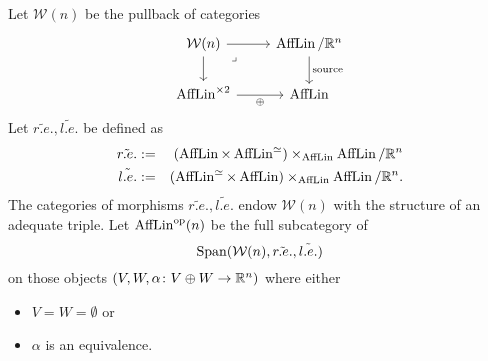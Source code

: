 \begin{construction}
    Let $\mathcal W(n)$ be the pullback of categories 
    \[\begin{tikzcd}
        {\mathcal W(n)} & {\AffLin/\R^n} \\
        {\AffLin^{\times 2}} & \AffLin
        \arrow["{\mathrm{source}}", from=1-2, to=2-2]
        \arrow["\oplus"', from=2-1, to=2-2]
        \arrow[from=1-1, to=2-1]
        \arrow[from=1-1, to=1-2]
        \arrow["\lrcorner"{anchor=center, pos=0.125}, draw=none, from=1-1, to=2-2]
    \end{tikzcd}\]
    Let $\tilde{r.e.}, \tilde{l.e.}$ be defined as 
    \begin{eqnarray*} 
        \tilde{r.e.} & := & \left(\operatorname{AffLin} \times \operatorname{AffLin}^\simeq \right) \times_{\operatorname{AffLin}} \operatorname{AffLin}/\mathbb{R}^n \\
        \tilde{l.e.} & := & \left(\operatorname{AffLin}^\simeq \times \operatorname{AffLin} \right) \times_{\operatorname{AffLin}} \operatorname{AffLin}/\mathbb{R}^n.
    \end{eqnarray*}
    The categories of morphisms $\tilde{r.e.}, \tilde{l.e.}$ endow $\mathcal W(n)$ with the structure of 
    an adequate triple. 
    Let $\operatorname{AffLin}^{\mathrm{op}}(n)$ be the full subcategory of
    \[
        \operatorname{Span}(\mathcal W(n), \tilde{r.e.}, \tilde{l.e.}) 
    \]
    on those objects $(V,W, \alpha \colon  V \oplus W \to \mathbb{R}^n)$ where either 
    \begin{itemize}
        \item $V = W = \emptyset$ or 
        \item $\alpha$ is an equivalence.
    \end{itemize}


\end{construction}
